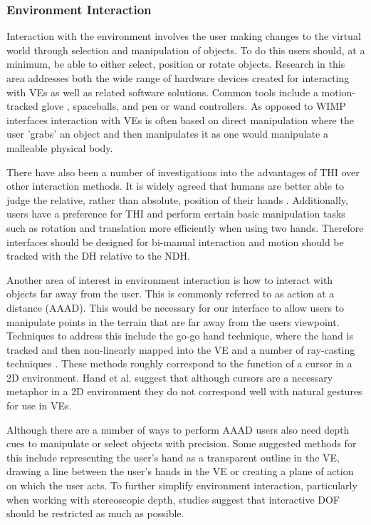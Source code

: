 \documentclass{sig-alternate-05-2015}
\begin{document}
\subsubsection{Environment Interaction}
Interaction with the environment involves the user making changes to the virtual world through selection and manipulation of objects. To do this users should, at a minimum, be able to either select, position or rotate objects\cite{Bowman2001}. Research in this area addresses both the wide range of hardware devices created for interacting with VEs as well as related software solutions. Common tools include a motion-tracked glove \cite{Zimmerman1986}, spaceballs\cite{Hand1997}, and pen or wand controllers\cite{Schultheis2012}. As opposed to WIMP interfaces interaction with VEs is often based on direct manipulation where the user 'grabs' an object and then manipulates it as one would manipulate a malleable physical body.

There have also been a number of investigations into the advantages of THI over other interaction methods. It is widely agreed that humans are better able to judge the relative, rather than absolute, position of their hands \cite{Bowman1998, Buxton1986}. Additionally, users have a preference for THI\cite{Buxton1986} and perform certain basic manipulation tasks such as rotation and translation more efficiently when using two hands\cite{Schultheis2012,Balakrishnan1999}. Therefore interfaces should be designed for bi-manual interaction and motion should be tracked with the DH relative to the NDH\cite{Hinckley1994}.

Another area of interest in environment interaction is how to interact with objects far away from the user. This is commonly referred to as action at a distance (AAAD). This would be necessary for our interface to allow users to manipulate points in the terrain that are far away from the users viewpoint. Techniques to address this include the go-go hand technique\cite{Poupyrev1996}, where the hand is tracked and then non-linearly mapped into the VE and a number of ray-casting techniques \cite{Bowman2001}. These methods roughly correspond to the function of a cursor in a 2D environment. Hand et al.\cite{Hand1997} suggest that although cursors are a necessary metaphor in a 2D environment they do not correspond well with natural gestures for use in VEs.

Although there are a number of ways to perform AAAD users also need depth cues to manipulate or select objects with precision.\cite{Schultheis2012} Some suggested methods for this include representing the user's hand as a transparent outline in the VE\cite{Hinckley1994}, drawing a line between the user's hands in the VE\cite{Schultheis2012} or creating a plane of action\cite{Mine2014} on which the user acts. To further simplify environment interaction, particularly when working with stereoscopic depth, studies suggest that interactive DOF should be restricted as much as possible\cite{Bowman2001}.
\end{document}
